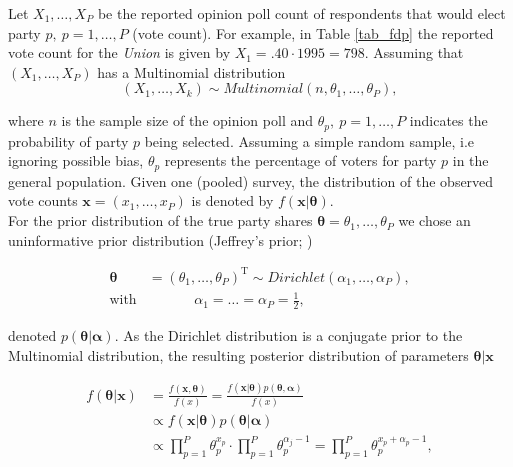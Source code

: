 \documentclass[smallcondensed]{svjour3}     %
\newcommand{\T}{\mathrm{\scriptscriptstyle T}}
\begin{document}
Let $X_1,\ldots, X_P$ be the reported opinion poll count of respondents that would
elect party $p, \ p=1,\ldots,P$ (vote count). For example, in Table \ref{tab_fdp}
the reported vote count for the \emph{Union} is given by $X_1 = .40 \cdot 1995 = 798$.
Assuming that $(X_1, \ldots, X_P)$ has a Multinomial distribution
\begin{equation}\label{eq:multinom}
(X_1,\ldots, X_k) \sim Multinomial(n, \theta_1,\ldots, \theta_P),
\end{equation}

where $n$ is the sample size of the opinion poll and $\theta_p, \ p=1,\ldots,P$
indicates the probability of party $p$ being selected. Assuming a
simple random sample, i.e ignoring possible bias,
$\theta_p$ represents the percentage of voters for party $p$ in
the general population.
 Given one (pooled) survey,
the distribution of the observed vote counts $\mathbf{x}=(x_1,\ldots,x_P)$ is
denoted by $f(\mathbf{x}|\boldsymbol{\theta})$.\\

For the prior distribution of the true party shares $\boldsymbol{\theta}=\theta_1,\ldots, \theta_P$
we chose an uninformative prior distribution
(Jeffrey's prior; \citet{gelman_2013})

\begin{equation}\label{eq:prior}
\begin{aligned}
\boldsymbol{\theta} &= (\theta_1,\ldots,\theta_P)^\T \sim Dirichlet(\alpha_1,\ldots,\alpha_P), \\
\text{with} &\ \ \ \ \ \ \ \ \ \ \ \ \ \ \ \alpha_1 = \ldots = \alpha_P = \frac{1}{2},
\end{aligned}
\end{equation}

denoted $p(\boldsymbol{\theta}|\boldsymbol{\alpha})$.
As the Dirichlet distribution is a conjugate prior to the Multinomial distribution,
the resulting posterior distribution of parameters $\boldsymbol{\theta}|\mathbf{x}$

\begin{align}
f(\boldsymbol{\theta}|\mathbf{x})
  & = \frac{f(\mathbf{x}, \boldsymbol{\theta})}{f(x)}
    = \frac{f(\mathbf{x}|\boldsymbol{\theta})p(\boldsymbol{\theta}, \boldsymbol{\alpha})}{f(x)}\\
  & \propto f(\mathbf{x}|\boldsymbol{\theta})p(\boldsymbol{\theta}|\boldsymbol{\alpha})\\
  & \propto \prod_{p=1}^{P}\theta_p^{x_p}\cdot \prod_{p=1}^{P}\theta_p^{\alpha_{j}-1} = \prod_{p=1}^{P}\theta_p^{x_p + \alpha_p-1},
\end{align}
\end{document}
